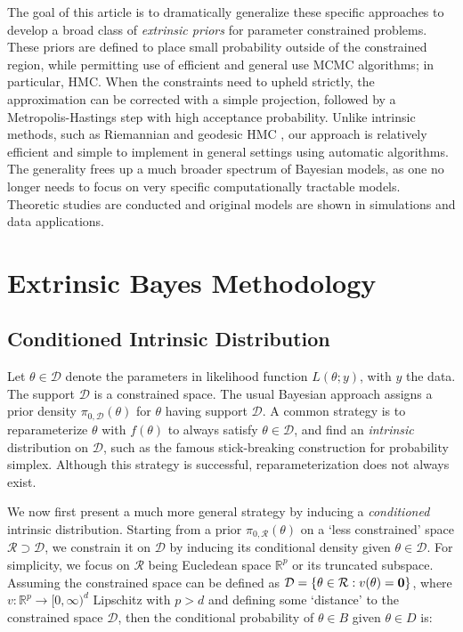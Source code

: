 \documentclass[10pt]{article}
\newcommand{\bb}[1]{\mathbb{#1}}
\newcommand{\mc}[1]{\mathcal{#1}}
\DeclareMathOperator{\1}{\mathbbm{1}}
\begin{document}
The goal of this article is to dramatically generalize these specific approaches to develop a broad class of {\em extrinsic priors} for parameter constrained problems. These priors are defined to place small probability outside of the constrained region, while permitting use of efficient and general use MCMC algorithms; in particular, HMC. When the constraints need to upheld strictly, the approximation can be corrected with a simple projection, followed by a Metropolis-Hastings step with high acceptance probability.
Unlike intrinsic methods, such as Riemannian and geodesic HMC \citep{girolami2011riemann,byrne2013geodesic}, our approach is
relatively efficient and simple to implement in general settings using automatic algorithms. The generality frees up a much broader spectrum of Bayesian models, as one no longer needs to focus on very specific computationally tractable models.
Theoretic studies are conducted and original models are shown in simulations and data applications.

\section{Extrinsic Bayes Methodology}

\subsection{Conditioned Intrinsic Distribution}

Let $\theta \in \mc D$ denote the parameters in likelihood function $L(\theta;y)$, with $y$ the data. The support $\mc D$ is a constrained space. The usual Bayesian approach assigns a prior density $\pi_{0,\mc D}(\theta)$ for $\theta$ having support $\mc D$. 
A common strategy is to reparameterize $\theta$ with $f(\theta)$ to always satisfy $\theta \in \mc D$, and find an {\it intrinsic} distribution on $\mc D$, such as the famous stick-breaking construction for probability simplex. Although this strategy is successful, reparameterization does not always exist.

We now first present a much more general strategy by inducing a {\it conditioned} intrinsic distribution. Starting from a prior $\pi_{0,\mc R}(\theta)$ on a `less constrained' space $\mc R\supset \mc D$, we constrain it on $\mc D$ by inducing its conditional density given $\theta\in \mc D$. For simplicity, we focus on $\mc R$ being Eucledean space $\mathbb{R}^{p}$ or its truncated subspace.  Assuming the constrained space can be defined as $\mc D = \{\theta\in \mc R:v(\theta)=\bf 0\}$, where $v: \bb{R}^p\rightarrow \bb [0,\infty)^d$ Lipschitz with $p>d$ and defining some `distance' to the constrained space $\mc D$, then the conditional probability of $\theta\in B$ given $\theta\in D$ is:
\end{document}
